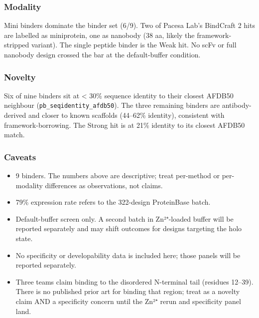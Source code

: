 \hypertarget{modality}{%
\subsubsection{Modality}\label{modality}}

Mini binders dominate the binder set (6/9). Two of Pacesa Lab's
BindCraft 2 hits are labelled as miniprotein, one as nanobody (38 aa,
likely the framework-stripped variant). The single peptide binder is the
Weak hit. No scFv or full nanobody design crossed the bar at the
default-buffer condition.

\hypertarget{novelty}{%
\subsubsection{Novelty}\label{novelty}}

Six of nine binders sit at \textless{} 30\% sequence identity to their
closest AFDB50 neighbour (\texttt{pb\_seqidentity\_afdb50}). The three
remaining binders are antibody-derived and closer to known scaffolds
(44--62\% identity), consistent with framework-borrowing. The Strong hit
is at 21\% identity to its closest AFDB50 match.

\hypertarget{caveats}{%
\subsubsection{Caveats}\label{caveats}}

\begin{itemize}
\tightlist
\item
  9 binders. The numbers above are descriptive; treat per-method or
  per-modality differences as observations, not claims.
\item
  79\% expression rate refers to the 322-design ProteinBase batch.
\item
  Default-buffer screen only. A second batch in Zn²⁺-loaded buffer will
  be reported separately and may shift outcomes for designs targeting
  the holo state.
\item
  No specificity or developability data is included here; those panels
  will be reported separately.
\item
  Three teams claim binding to the disordered N-terminal tail (residues
  12--39). There is no published prior art for binding that region;
  treat as a novelty claim AND a specificity concern until the Zn²⁺
  rerun and specificity panel land.
\end{itemize}
